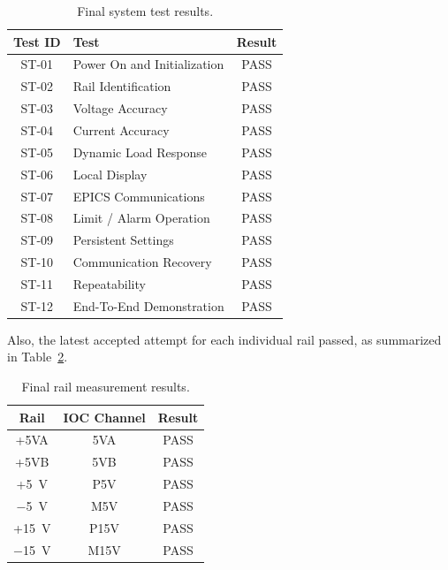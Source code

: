 \begin{table}[htbp]
    \centering
    \caption{Final system test results.}
    \label{tab:system-test-results}
    \begin{tabular}{clc}
        \hline
        \textbf{Test ID} & \textbf{Test} & \textbf{Result} \\
        \hline
        ST-01 & Power On and Initialization & PASS \\
        ST-02 & Rail Identification & PASS \\
        ST-03 & Voltage Accuracy & PASS \\
        ST-04 & Current Accuracy & PASS \\
        ST-05 & Dynamic Load Response & PASS \\
        ST-06 & Local Display & PASS \\
        ST-07 & EPICS Communications & PASS \\
        ST-08 & Limit / Alarm Operation & PASS \\
        ST-09 & Persistent Settings & PASS \\
        ST-10 & Communication Recovery & PASS \\
        ST-11 & Repeatability & PASS \\
        ST-12 & End-To-End Demonstration & PASS \\
        \hline
    \end{tabular}
\end{table}

Also, the latest accepted attempt for each individual rail passed, as summarized in Table~\ref{tab:rail-results}.

\begin{table}[htbp]
    \centering
    \caption{Final rail measurement results.}
    \label{tab:rail-results}
    \begin{tabular}{ccc}
        \hline
        \textbf{Rail} & \textbf{IOC Channel} & \textbf{Result} \\
        \hline
        +5VA  & 5VA  & PASS \\
        +5VB  & 5VB  & PASS \\
        +5~V  & P5V  & PASS \\
        $-$5~V  & M5V  & PASS \\
        +15~V & P15V & PASS \\
        $-$15~V & M15V & PASS \\
        \hline
    \end{tabular}
\end{table}

